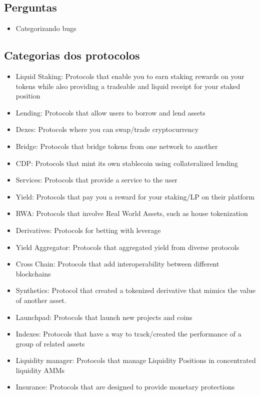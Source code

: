 \documentclass[11pt]{article}
\begin{document}
\subsection{Perguntas}
\label{sec:org938e8a1}
\begin{itemize}
\item Categorizando bugs
\end{itemize}
\subsection{Categorias dos protocolos}
\label{sec:org7f77e35}
\begin{itemize}
\item Liquid Staking: Protocols that enable you to earn staking rewards on your tokens while also providing a tradeable and liquid receipt for your staked position
\item Lending: Protocols that allow users to borrow and lend assets
\item Dexes: Protocols where you can swap/trade cryptocurrency
\item Bridge: Protocols that bridge tokens from one network to another
\item CDP: Protocols that mint its own stablecoin using collateralized lending
\item Services: Protocols that provide a service to the user
\item Yield: Protocols that pay you a reward for your staking/LP on their platform
\item RWA: Protocols that involve Real World Assets, such as house tokenization
\item Derivatives: Protocols for betting with leverage
\item Yield Aggregator: Protocols that aggregated yield from diverse protocols
\item Cross Chain: Protocols that add interoperability between different blockchains
\item Synthetics: Protocol that created a tokenized derivative that mimics the value of another asset.
\item Launchpad: Protocols that launch new projects and coins
\item Indexes: Protocols that have a way to track/created the performance of a group of related assets
\item Liquidity manager: Protocols that manage Liquidity Positions in concentrated liquidity AMMs
\item Insurance: Protocols that are designed to provide monetary protections

\end{itemize}
\end{document}
